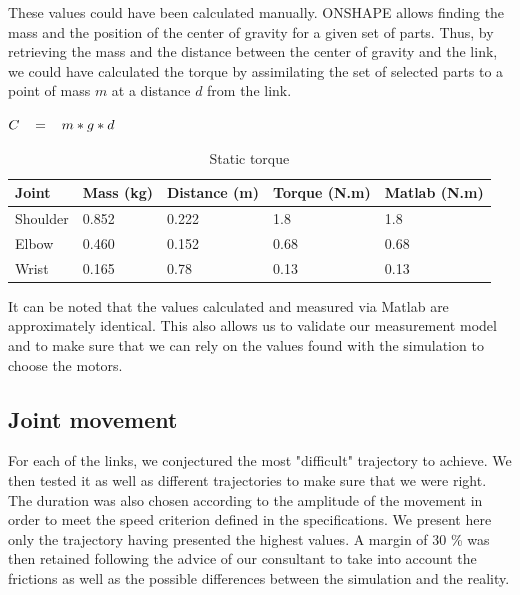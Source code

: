 \bigbreak
These values could have been calculated manually. ONSHAPE allows finding the mass and the position of the center of gravity for a given set of parts. Thus, by retrieving the mass and the distance between the center of gravity and the link, we could have calculated the torque by assimilating the set of selected parts to a point of mass $m$ at a distance $d$ from the link.
\begin{center}
    $C\hspace*{0.3cm}=\hspace*{0.3cm}m*g*d$
\end{center}
\begin{table}[ht]
    \centering
    \begin{tabular}{|p{1.5cm} | p{2cm} | p{2.5cm}| p{2.7cm} | p{2.7cm} |} 
        \hline
        \textbf{Joint} & \textbf{Mass (kg)} & \textbf{Distance (m)}& \textbf{Torque (N.m)}& \textbf{Matlab (N.m)}\\ [0.3ex] 
        \hline
        Shoulder & 0.852 & 0.222 & 1.8 & 1.8 \\ 
        \hline
        Elbow & 0.460 & 0.152 & 0.68 & 0.68 \\ 
        \hline
        Wrist & 0.165 & 0.78 & 0.13 & 0.13 \\ 
        \hline
    \end{tabular}
    \caption{Static torque}
\end{table}
\FloatBarrier

\bigbreak
It can be noted that the values calculated and measured via Matlab are approximately identical. This also allows us to validate our measurement model and to make sure that we can rely on the values found with the simulation to choose the motors.

\subsection{Joint movement}

For each of the links, we conjectured the most "difficult" trajectory to achieve. We then tested it as well as different trajectories to make sure that we were right. The duration was also chosen according to the amplitude of the movement in order to meet the speed criterion defined in the specifications. We present here only the trajectory having presented the highest values. A margin of 30 \% was then retained following the advice of our consultant to take into account the frictions as well as the possible differences between the simulation and the reality.

